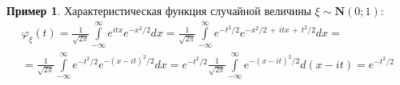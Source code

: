 \documentclass[oneside,final,14pt]{extreport}
\theoremstyle{plain}
\theoremstyle{definition}
\newtheorem*{exmp}{Пример}
\theoremstyle{named}
\begin{document}
\begin{exmp}
    Характеристическая функция случайной величины $\xi \sim \mathbf{N}(0;1)$:
    \begin{multline*}
        \varphi_{\xi}(t) 
        = \frac{1}{\sqrt{2 \pi}} \int\limits_{-\infty}^{\infty} e^{i t x} e^{-x^{2} / 2} d x
        = \frac{1}{\sqrt{2 \pi}} \int\limits_{-\infty}^{\infty} e^{-t^{2} / 2} e^{-x^2/2 \,+\, itx \,+\, t^2/2} d x = \\
        = \frac{1}{\sqrt{2 \pi}} \int\limits_{-\infty}^{\infty} e^{-t^{2} / 2} e^{-(x-i t)^{2} / 2} d x =  
         e^{-t^{2} / 2} \frac{1}{\sqrt{2 \pi}} \int\limits_{-\infty}^{\infty} e^{-(x-i t)^{2} / 2} d(x-i t)
        = e^{-t^{2} / 2}
    \end{multline*}
\end{exmp}
\end{document}

